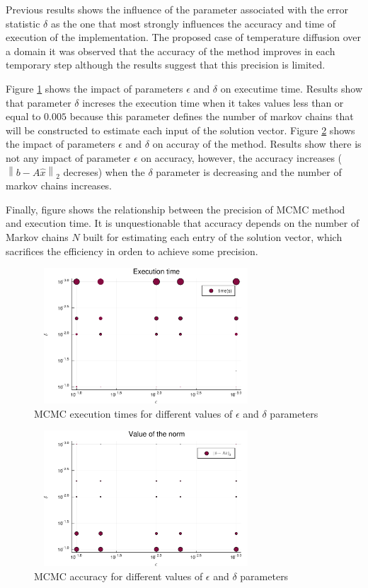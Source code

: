 \documentclass{juliacon}
\begin{document}
Previous results shows the influence of the parameter associated with the error statistic $\delta$ as the one that most strongly influences the accuracy and time of execution of the implementation. The proposed case of temperature diffusion over a domain it was observed that the accuracy of the method improves in each temporary step although the results suggest that this precision is limited.

Figure \ref{fig:time} shows the impact of parameters $\epsilon $ and $\delta$ on executime time. Results show that parameter $\delta$ increses the execution time when it takes values less than or equal to $0.005$ because this parameter defines the number of markov chains that will be constructed to estimate each input of the solution vector. Figure \ref{fig:norm} shows the impact of parameters $\epsilon $ and $\delta$ on accuray of the method. Results show there is not any impact of parameter $\epsilon$ on accuracy, however, the accuracy increases ($\left \|b - A\hat{x} \right \|_2$ decreses) when the $\delta$ parameter is decreasing and the number of markov chains increases.

Finally, figure shows the relationship between the precision of MCMC method and execution time. It is unquestionable that accuracy depends on the number of Markov chains $N$ built for estimating each entry of the solution vector, which sacrifices the efficiency in orden to achieve some precision.  


\begin{figure}[h!]
 \includegraphics[height=2.0in, width=3.3in]{exectime}
 \caption{MCMC execution times for different values of $\epsilon$ and $\delta$ parameters}
 \label{fig:time}
\end{figure}

\begin{figure}[h!]
 \includegraphics[height=2.0in, width=3.3in]{norm.pdf}
 \caption{MCMC accuracy for different values of $\epsilon$ and $\delta$ parameters}
 \label{fig:norm}
\end{figure} 
\end{document}
